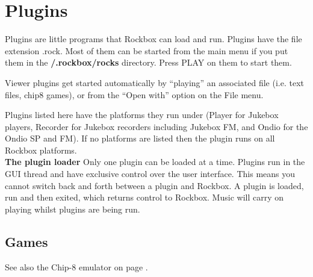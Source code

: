 \chapter{Plugins}
\newpage
Plugins are little programs that Rockbox can load and run. Plugins have
the file extension .rock.  Most of them can be started from the main
menu if you put them in the \textbf{/.rockbox/rocks} directory. Press
PLAY on them to start them. 

Viewer plugins get started automatically by
``playing'' an associated file (i.e. text
files, chip8 games), or from the ``Open with'' option on the File menu.

Plugins listed here have the platforms they run under (Player for
Jukebox players, Recorder for Jukebox recorders including Jukebox FM,
and Ondio for the Ondio SP and FM).  If no platforms are listed then
the plugin runs on all Rockbox platforms.\\

\textbf{The plugin loader}
Only one plugin can be loaded at a time. Plugins run in the GUI thread
and have exclusive control over the user interface. This means you
cannot switch back and forth between a plugin and Rockbox. A plugin is
loaded, run and then exited, which returns control to Rockbox.  Music
will carry on playing whilst plugins are being run.

\section{Games}
See also the Chip{}-8 emulator on page \pageref{ref:Chip8emulator}.









